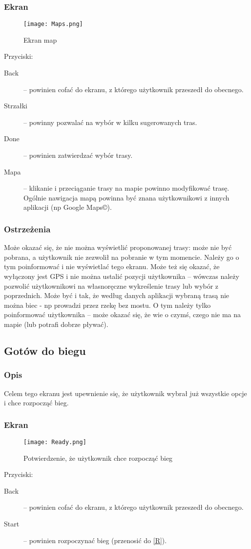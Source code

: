 \subsubsection{Ekran}
\begin{figure}[b!]
  \texttt{[image: Maps.png]}
  \caption{Ekran map}
  \label{M}
\end{figure}
Przyciski:\\
\begin{description}
  \item[Back] -- powinien cofać do ekranu, z którego użytkownik przeszedł do obecnego.
  \item[Strzałki] -- powinny pozwalać na wybór w kilku sugerowanych tras.
  \item[Done] -- powinien zatwierdzać wybór trasy.
  \item[Mapa] -- klikanie i przeciąganie trasy na mapie powinno modyfikować trasę. Ogólnie nawigacja mapą powinna być znana użytkownikowi z innych aplikacji (np Google Maps©).
\end{description}
\subsubsection{Ostrzeżenia}
\noindent Może okazać się, że nie można wyświetlić proponowanej trasy: może nie być pobrana, a użytkownik nie zezwolił na pobranie w tym momencie. Należy go o tym poinformować i nie wyświetlać tego ekranu. Może też się okazać, że wyłączony jest GPS i nie można ustalić pozycji użytkownika -- wówczas należy pozwolić użytkownikowi na własnoręczne wykreślenie trasy lub wybór z poprzednich. Może być i tak, że według danych aplikacji wybraną trasą nie można biec - np prowadzi przez rzekę bez mostu. O tym należy tylko poinformować użytkownika -- może okazać się, że wie o czymś, czego nie ma na mapie (lub potrafi dobrze pływać).
\subsection{Gotów do biegu}
\subsubsection{Opis}
\noindent Celem tego ekranu jest upewnienie się, że użytkownik wybrał już wszystkie opcje i chce rozpocząć bieg. 
\subsubsection{Ekran}
\begin{figure}[b!]
  \texttt{[image: Ready.png]}
  \caption{Potwierdzenie, że użytkownik chce rozpocząć bieg}
  \label{RR}
\end{figure}
Przyciski:\\
\begin{description}
  \item[Back] -- powinien cofać do ekranu, z którego użytkownik przeszedł do obecnego.
  \item[Start] -- powinien rozpoczynać bieg (przenosić do \ref{R}).
\end{description}
